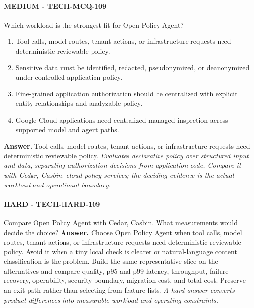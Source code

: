 \paragraph{MEDIUM - TECH-MCQ-109} Which workload is the strongest fit for Open Policy Agent?
\begin{enumerate}[label=\Alph*.]
\item Tool calls, model routes, tenant actions, or infrastructure requests need deterministic reviewable policy.
\item Sensitive data must be identified, redacted, pseudonymized, or deanonymized under controlled application policy.
\item Fine-grained application authorization should be centralized with explicit entity relationships and analyzable policy.
\item Google Cloud applications need centralized managed inspection across supported model and agent paths.
\end{enumerate}
\textbf{Answer.} Tool calls, model routes, tenant actions, or infrastructure requests need deterministic reviewable policy.
\textit{Evaluates declarative policy over structured input and data, separating authorization decisions from application code. Compare it with Cedar, Casbin, cloud policy services; the deciding evidence is the actual workload and operational boundary.}
\paragraph{HARD - TECH-HARD-109} Compare Open Policy Agent with Cedar, Casbin. What measurements would decide the choice?
\textbf{Answer.} Choose Open Policy Agent when tool calls, model routes, tenant actions, or infrastructure requests need deterministic reviewable policy. Avoid it when a tiny local check is clearer or natural-language content classification is the problem. Build the same representative slice on the alternatives and compare quality, p95 and p99 latency, throughput, failure recovery, operability, security boundary, migration cost, and total cost. Preserve an exit path rather than selecting from feature lists.
\textit{A hard answer converts product differences into measurable workload and operating constraints.}
